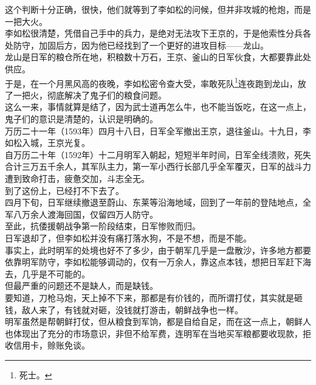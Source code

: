 \begin{multicols}{\theparacolNo}
这个判断十分正确，很快，他们就等到了李如松的问候，但并非攻城的枪炮，而是一把大火。\\

李如松很清楚，凭借自己手中的兵力，是绝对无法攻下王京的，于是他索性分兵各处防守，加固后方，因为他已经找到了一个更好的进攻目标——龙山。\\

龙山是日军的粮仓所在地，积粮数十万石，王京、釜山的日军伙食，大都要靠此处供应。\\

于是，在一个月黑风高的夜晚，李如松密令查大受，率敢死队\footnote{死士。}连夜跑到龙山，放了一把火，彻底解决了鬼子们的粮食问题。\\

这么一来，事情就算是结了，因为武士道再怎么牛，也不能当饭吃，在这一点上，鬼子们的意识是清楚的，认识是明确的。\\

万历二十一年（1593年）四月十八日，日军全军撤出王京，退往釜山。十九日，李如松入城，王京光复。\\

自万历二十年（1592年）十二月明军入朝起，短短半年时间，日军全线溃败，死失合计三万五千余人，其军队主力，第一军小西行长部几乎全军覆灭，日军的战斗力遭到致命打击，疲惫交加，斗志全无。\\

到了这份上，已经打不下去了。\\

四月下旬，日军继续撤退至蔚山、东莱等沿海地域，回到了一年前的登陆地点，全军八万余人渡海回国，仅留四万人防守。\\

至此，抗倭援朝战争第一阶段结束，日军惨败而归。\\

日军退却了，但李如松并没有痛打落水狗，不是不想，而是不能。\\

事实上，此时明军的处境也好不了多少，由于朝军几乎是一盘散沙，许多地方都要依靠明军防守，李如松能够调动的，仅有一万余人，靠这点本钱，想把日军赶下海去，几乎是不可能的。\\

但最严重的问题还不是缺人，而是缺钱。\\

要知道，刀枪马炮，天上掉不下来，那都是有价钱的，而所谓打仗，其实就是砸钱，敌人来了，有钱就对砸，没钱就打游击，朝鲜战争也一样。\\

明军虽然是帮朝鲜打仗，但从粮食到军饷，都是自给自足，而在这一点上，朝鲜人也体现出了充分的市场意识，非但不给军费，连明军在当地买军粮都要收现款，拒收信用卡，赊账免谈。\\


\end{multicols}
